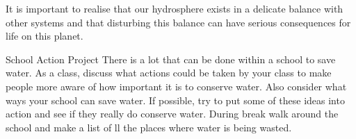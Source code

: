       \label{m38138*id342412}It is important to realise that our hydrosphere exists in a delicate balance with other systems and that disturbing this balance can have serious consequences for life on this planet.\par 
\label{m38138*secfhsst!!!underscore!!!id1065}
            \begin{project}{School Action Project
      }
            \nopagebreak
      \label{m38138*id342430}There is a lot that can be done within a school to save water. As a class, discuss what actions could be taken by your class to make people more aware of how important it is to conserve water. Also consider what ways your school can save water. If possible, try to put some of these ideas into action and see if they really do conserve water. During break walk around the school and make a list of ll the places where water is being wasted.
 \par 
\end{project}
